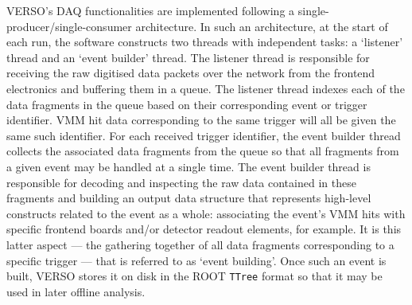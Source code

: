 VERSO's DAQ functionalities are implemented following a single-producer/single-consumer
architecture.
In such an architecture, at the start of each run, the software constructs two threads with independent
tasks: a `listener' thread and an `event builder' thread.
The listener thread is responsible for receiving the raw digitised data packets over the network from the
frontend electronics and buffering them in a queue.
The listener thread indexes each of the data fragments in the queue based on their corresponding
event or trigger identifier.
VMM hit data corresponding to the same trigger will all be given the
same such identifier.
For each received trigger identifier, the event builder thread collects the associated data fragments from
the queue so that all fragments from a given event may be handled at a single time.
The event builder thread is responsible for decoding and inspecting the raw data contained in these fragments and building
an output data structure that represents high-level constructs related to the event as a whole: associating
the event's VMM hits with specific frontend boards and/or detector readout elements, for example.
It is this latter aspect --- the gathering together of all data fragments corresponding to a specific trigger ---
that is referred to as `event building'.
Once such an event is built, VERSO stores it on disk in the ROOT \texttt{TTree} format
so that it may be used in later offline analysis.

